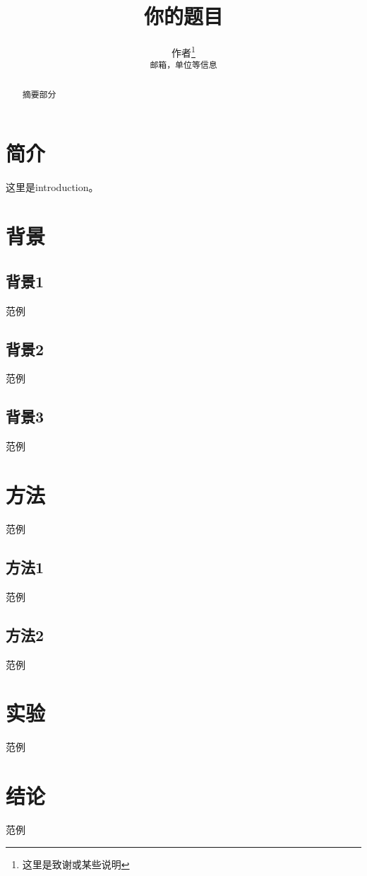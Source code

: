 \documentclass[UTF8]{article}
\title{你的题目}
\author{%
  作者\thanks{这里是致谢或某些说明} \\
  \texttt{邮箱，单位等信息} \\
}
\begin{document}
\maketitle


\begin{abstract}
  摘要部分
\end{abstract}


\section{简介}
这里是introduction。
\section{背景}
\subsection{背景1}
范例

\subsection{背景2}
范例
\subsection{背景3}
范例

\section{方法}
范例
\subsection{方法1}
范例
\subsection{方法2}
范例
\section{实验}
范例
\section{结论}
范例


\end{document}
